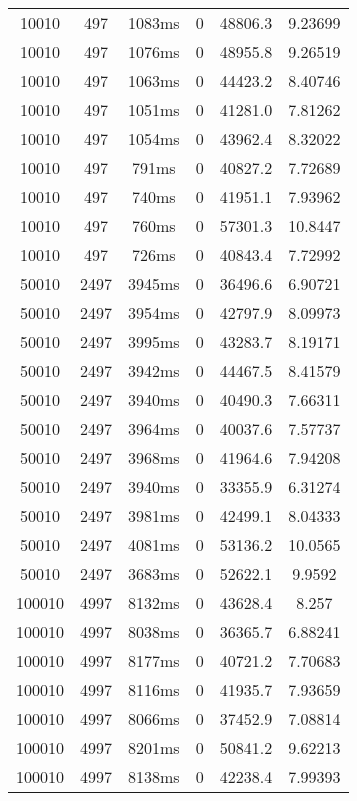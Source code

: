 \documentclass[./main.tex]{subfiles}
\begin{document}
\begin{table}
\begin{tabular}{ c | c | c | c | c | c }
        10010 & 497 & 1083ms & 0 & 48806.3 & 9.23699 \\
        10010 & 497 & 1076ms & 0 & 48955.8 & 9.26519 \\
        10010 & 497 & 1063ms & 0 & 44423.2 & 8.40746 \\
        10010 & 497 & 1051ms & 0 & 41281.0 & 7.81262 \\
        10010 & 497 & 1054ms & 0 & 43962.4 & 8.32022 \\
        10010 & 497 & 791ms & 0 & 40827.2 & 7.72689 \\
        10010 & 497 & 740ms & 0 & 41951.1 & 7.93962 \\
        10010 & 497 & 760ms & 0 & 57301.3 & 10.8447 \\
        10010 & 497 & 726ms & 0 & 40843.4 & 7.72992 \\
        \hline
        50010 & 2497 & 3945ms & 0 & 36496.6 & 6.90721 \\
        50010 & 2497 & 3954ms & 0 & 42797.9 & 8.09973 \\
        50010 & 2497 & 3995ms & 0 & 43283.7 & 8.19171 \\
        50010 & 2497 & 3942ms & 0 & 44467.5 & 8.41579 \\
        50010 & 2497 & 3940ms & 0 & 40490.3 & 7.66311 \\
        50010 & 2497 & 3964ms & 0 & 40037.6 & 7.57737 \\
        50010 & 2497 & 3968ms & 0 & 41964.6 & 7.94208 \\
        50010 & 2497 & 3940ms & 0 & 33355.9 & 6.31274 \\
        \rowcolor{lightgray} 50010 & 2497 & 3981ms & 0 & 42499.1 & 8.04333 \\
        50010 & 2497 & 4081ms & 0 & 53136.2 & 10.0565 \\
        50010 & 2497 & 3683ms & 0 & 52622.1 & 9.9592 \\
        \hline
        100010 & 4997 & 8132ms & 0 & 43628.4 & 8.257 \\
        100010 & 4997 & 8038ms & 0 & 36365.7 & 6.88241 \\
        100010 & 4997 & 8177ms & 0 & 40721.2 & 7.70683 \\
        \rowcolor{lightgray} 100010 & 4997 & 8116ms & 0 & 41935.7 & 7.93659 \\
        100010 & 4997 & 8066ms & 0 & 37452.9 & 7.08814 \\
        100010 & 4997 & 8201ms & 0 & 50841.2 & 9.62213 \\
        100010 & 4997 & 8138ms & 0 & 42238.4 & 7.99393 \\

\end{tabular}
\end{table}
\end{document}
